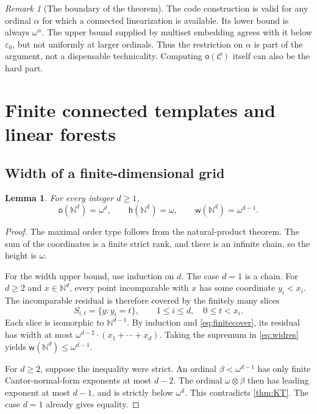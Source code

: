 \documentclass[11pt,letterpaper]{article}
\theoremstyle{plain}
\newtheorem{lemma}[lemma]{Lemma}
\theoremstyle{definition}
\theoremstyle{remark}
\newtheorem{remark}[remark]{Remark}
\newcommand{\N}{\mathbb N}
\newcommand{\mot}{\mathsf o}
\newcommand{\wid}{\mathsf w}
\newcommand{\hei}{\mathsf h}
\newcommand{\Cl}{\mathcal C}
\newcommand{\eps}{\varepsilon}
\begin{document}
\begin{remark}[The boundary of the theorem]\label{rem:epsilon}
The code construction is valid for any ordinal $\alpha$ for which a
connected linearization is available. Its lower bound is always
$\omega^\alpha$. The upper bound supplied by multiset embedding agrees
with it below $\eps_0$, but not uniformly at larger ordinals. Thus the
restriction on $\alpha$ is part of the argument, not a dispensable
technicality. Computing $\mot(\Cl)$ itself can also be the hard part.
\end{remark}

\section{Finite connected templates and linear forests}\label{sec:finite}

\subsection{Width of a finite-dimensional grid}

\begin{lemma}\label{lem:grid}
For every integer $d\ge1$,
\[
 \mot(\N^d)=\omega^d,\qquad
 \hei(\N^d)=\omega,\qquad
 \wid(\N^d)=\omega^{d-1}.
\]
\end{lemma}

\begin{proof}
The maximal order type follows from the natural-product theorem.
The sum of the coordinates is a finite strict rank, and there is an
infinite chain, so the height is $\omega$.

For the width upper bound, use induction on $d$. The case $d=1$ is a
chain. For $d\ge2$ and $x\in\N^d$, every point incomparable with $x$
has some coordinate $y_i<x_i$. The incomparable residual is therefore
covered by the finitely many slices
\[
 S_{i,t}=\{y:y_i=t\},\qquad 1\le i\le d,\quad 0\le t<x_i.
\]
Each slice is isomorphic to $\N^{d-1}$. By induction and
\cref{eq:finitecover}, its residual has width at most
$\omega^{d-2}\cdot(x_1+\cdots+x_d)$. Taking the supremum in
\cref{eq:widres} yields $\wid(\N^d)\le\omega^{d-1}$.

For $d\ge2$, suppose the inequality were strict. An ordinal
$\beta<\omega^{d-1}$ has only finite Cantor-normal-form exponents at
most $d-2$. The ordinal $\omega\otimes\beta$ then has leading exponent
at most $d-1$, and is strictly below $\omega^d$. This contradicts
\cref{thm:KT}. The case $d=1$ already gives equality.
\end{proof}
\end{document}
